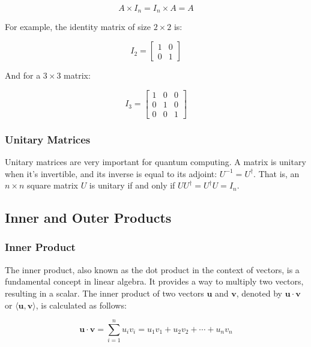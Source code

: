 \documentclass{article}
\begin{document}
\begin{equation*}
    A \times I_n = I_n \times A = A
\end{equation*}

For example, the identity matrix of size \( 2 \times 2 \) is:

\begin{equation*}
    I_2 = \begin{bmatrix} 1 & 0 \\ 0 & 1 \end{bmatrix}
\end{equation*}

And for a \( 3 \times 3 \) matrix:

\begin{equation*}
    I_3 = \begin{bmatrix} 1 & 0 & 0 \\ 0 & 1 & 0 \\ 0 & 0 & 1 \end{bmatrix}
\end{equation*}
\subsubsection{Unitary Matrices}
Unitary matrices are very important for quantum computing. A matrix is unitary when it's invertible, and its inverse is equal to its adjoint: $U^{-1} = U^\dagger$. That is, an $n \times n$ square matrix $U$ is unitary if and only if $UU^\dagger = U^\dagger U = I_n$. 
\subsection{Inner and Outer Products}
\subsubsection{Inner Product}

The inner product, also known as the dot product in the context of vectors, is a fundamental concept in linear algebra. It provides a way to multiply two vectors, resulting in a scalar. The inner product of two vectors \( \mathbf{u} \) and \( \mathbf{v} \), denoted by \( \mathbf{u} \cdot \mathbf{v} \) or \( \langle \mathbf{u}, \mathbf{v} \rangle \), is calculated as follows:

\begin{equation}
    \mathbf{u} \cdot \mathbf{v} = \sum_{i=1}^{n} u_i v_i = u_1 v_1 + u_2 v_2 + \cdots + u_n v_n
\end{equation}
\end{document}
